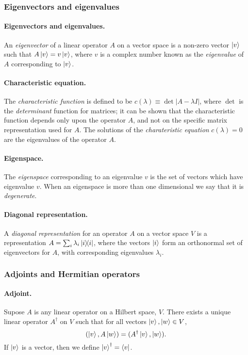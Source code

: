 \documentclass{article}
\numberwithin{theorem}{section}
\numberwithin{corollary}{section}
\numberwithin{postulate}{section}
\begin{document}
\subsubsection{Eigenvectors and eigenvalues}

\paragraph{Eigenvectors and eigenvalues.} An \emph{eigenvector} of a linear
operator $A$ on a vector space is a non-zero vector $\ket{v}$ such that
$A\ket{v} = v\ket{v}$, where $v$ is a complex number known as the
\emph{eigenvalue} of $A$ corresponding to $\ket{v}$.

\paragraph{Characteristic equation.} The \emph{characteristic function} is
defined to be $c(\lambda) \equiv \det|A - \lambda I|$, where $\det$ is the
\emph{determinant} function for matrices; it can be shown that the
characteristic function depends only upon the operator $A$, and not on the
specific matrix representation used for $A$. The solutions of the
\emph{charateristic equation} $c(\lambda) = 0$ are the eigenvalues of the
operator $A$.

\paragraph{Eigenspace.} The \emph{eigenspace} corresponding to an eigenvalue
$v$ is the set of vectors which have eigenvalue $v$. When an eigenspace is more
than one dimensional we say that it is \emph{degenerate}.

\paragraph{Diagonal representation.} A \emph{diagonal representation} for an
operator $A$ on a vector space $V$ is a representation $A = \sum_i
\lambda_i\op{i}{i}$, where the vectors $\ket{i}$ form an orthonormal set of
eigenvectors for $A$, with corresponding eigenvalues $\lambda_i$.

\subsubsection{Adjoints and Hermitian operators}

\paragraph{Adjoint.} Supose $A$ is any linear operator on a Hilbert space, $V$.
There exists a unique linear operator $A^{\dagger}$ on $V$ such that for all
vectors $\ket{v}, \ket{w} \in V$, \[
  (\ket{v}, A\ket{w}) = (A^{\dagger}\ket{v}, \ket{w}).
\] If $\ket{v}$ is a vector, then we define $\ket{v}^{\dagger} = \bra{v}$.
\end{document}
